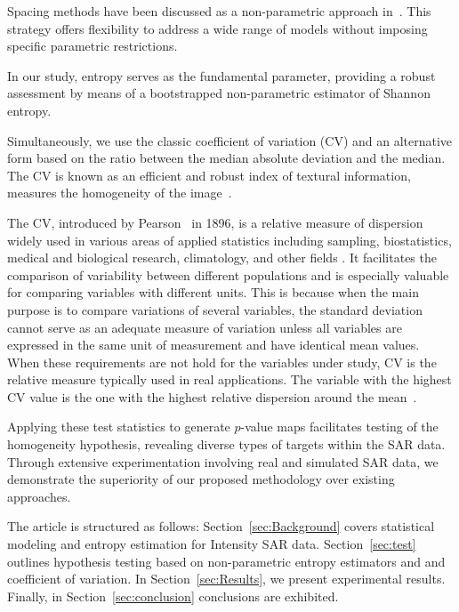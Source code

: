 \documentclass[remotesensing,article,submit,moreauthors,pdftex]{Definitions/mdpi}
\begin{document}
Spacing methods have been discussed as a non-parametric approach
in~\cite{AlizadehNoughabi2010,Subhash2021}. This strategy offers
flexibility to address a wide range of models without imposing specific
parametric restrictions.

In our study, entropy serves as the fundamental parameter, providing a
robust assessment by means of a bootstrapped non-parametric estimator of
Shannon entropy.

Simultaneously, we use the classic coefficient of variation (CV) and an
alternative form based on the ratio between the median absolute
deviation and the median. The CV is known as an efficient and robust
index of textural information, measures the homogeneity of the
image~\cite{Lopes1990}.

The CV, introduced by Pearson~\cite{Pearson1896} in 1896, is a relative
measure of dispersion widely used in various areas of applied statistics
including sampling, biostatistics, medical and biological research,
climatology, and other fields
\cite{hendricks1936sampling, Tian2005,SubrahmanyaNairy2003,Chankham2024}.
It facilitates the comparison of variability between different
populations and is especially valuable for comparing variables with
different units. This is because when the main purpose is to compare
variations of several variables, the standard deviation cannot serve as
an adequate measure of variation unless all variables are expressed in
the same unit of measurement and have identical mean values. When these
requirements are not hold for the variables under study, CV is the
relative measure typically used in real applications. The variable with
the highest CV value is the one with the highest relative dispersion
around the mean~\cite{Banik2011}.

Applying these test statistics to generate \(p\)-value maps facilitates
testing of the homogeneity hypothesis, revealing diverse types of
targets within the SAR data. Through extensive experimentation involving
real and simulated SAR data, we demonstrate the superiority of our
proposed methodology over existing approaches.

The article is structured as follows: Section~\ref{sec:Background}
covers statistical modeling and entropy estimation for Intensity SAR
data. Section~\ref{sec:test} outlines hypothesis testing based on
non-parametric entropy estimators and and coefficient of variation. In
Section~\ref{sec:Results}, we present experimental results. Finally, in
Section~\ref{sec:conclusion} conclusions are exhibited.
\end{document}
